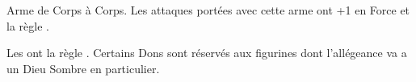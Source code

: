 \newpage
\startarmyarmoury

\startitemlistonecol

\listitemonecol{\daemonweapon}Arme de Corps à Corps. Les attaques portées avec cette arme ont +1 en Force et la règle \magicalattacks{}.

\enditemlistonecol

\closearmyarmoury












\spaceaftersection{}

Les \giftsofthedarkgods{} ont la règle \oneperarmy{}. Certains Dons sont réservés aux figurines dont l'allégeance va a un Dieu Sombre en particulier.

